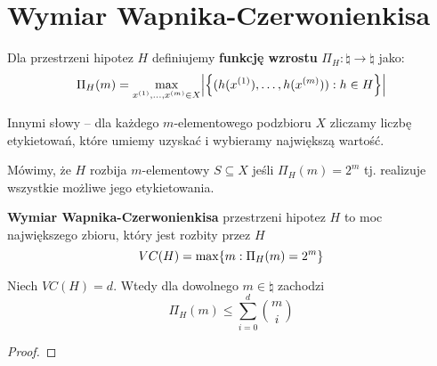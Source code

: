 \section{Wymiar Wapnika-Czerwonienkisa}

\begin{definition}
	Dla przestrzeni hipotez \( H \) definiujemy \textbf{funkcję wzrostu} \( \Pi_H : \natural \rightarrow \natural \) jako:
	\[
		\Pi_H(m) = \max_{x^{(1)}, \dots, x^{(m)} \in X} \card{\set{(h(x^{(1)}), \dots, h(x^{(m)}) ) : h \in H}}
	\]
\end{definition}
Innymi słowy -- dla każdego \( m \)-elementowego podzbioru \( X \) zliczamy liczbę etykietowań, które umiemy uzyskać i wybieramy największą wartość.

\begin{definition}
	Mówimy, że \( H \) rozbija \(m\)-elementowy \( S \subseteq X \) jeśli \( \Pi_H(m) = 2^m \) tj. realizuje wszystkie możliwe jego etykietowania.
\end{definition}
\begin{definition}
	\textbf{Wymiar Wapnika-Czerwonienkisa} przestrzeni hipotez \( H \) to moc największego zbioru, który jest rozbity przez \( H \)
	\[
		VC(H) = \max \set{m : \Pi_{H}(m) = 2^m}
	\]
\end{definition}

\begin{lemma}[Sauer]
	Niech \( VC(H) = d \). Wtedy dla dowolnego \( m \in \natural \) zachodzi
	\[
		\Pi_H(m) \leq \sum_{i=0}^d \binom{m}{i}
	\]
\end{lemma}
\begin{proof}

\end{proof}